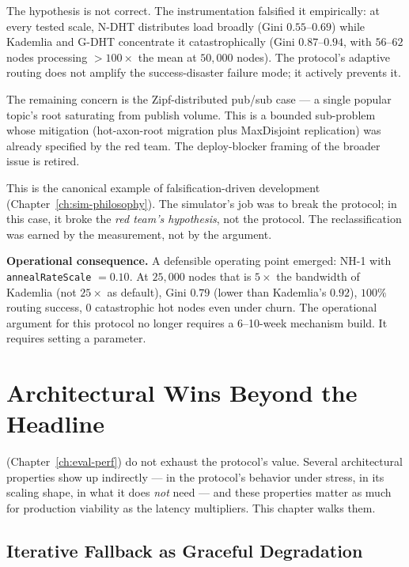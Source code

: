 \documentclass[twoside,nobib]{tufte-book}
\newcommand{\NDHT}{N-DHT\xspace}
\newcommand{\GDHT}{G-DHT\xspace}
\begin{document}
The hypothesis is not correct. The instrumentation falsified it
empirically: at every tested scale, \NDHT distributes load
broadly (Gini $0.55$--$0.69$) while Kademlia and \GDHT
concentrate it catastrophically (Gini $0.87$--$0.94$, with
$56$--$62$ nodes processing $>100\times$ the mean at
$50{,}000$ nodes). The protocol's adaptive routing does not
amplify the success-disaster failure mode; it actively prevents
it.

The remaining concern is the Zipf-distributed pub/sub case ---
a single popular topic's root saturating from publish volume.
This is a bounded sub-problem whose mitigation (hot-axon-root
migration plus MaxDisjoint replication) was already specified
by the red team. The deploy-blocker framing of the broader issue
is retired.

This is the canonical example of falsification-driven
development (Chapter~\ref{ch:sim-philosophy}). The simulator's
job was to break the protocol; in this case, it broke the
\emph{red team's hypothesis}, not the protocol. The
reclassification was earned by the measurement, not by the
argument.

\textbf{Operational consequence.} A defensible operating point
emerged: NH-1 with \texttt{annealRateScale} $= 0.10$. At
$25{,}000$ nodes that is $5\times$ the bandwidth of Kademlia
(not $25\times$ as default), Gini $0.79$ (lower than Kademlia's
$0.92$), $100\%$ routing success, $0$ catastrophic hot nodes
even under churn. The operational argument for this protocol
no longer requires a 6--10-week mechanism build. It requires
setting a parameter.


\chapter{Architectural Wins Beyond the Headline}
\label{ch:eval-wins}

 (Chapter~\ref{ch:eval-perf})
do not exhaust the protocol's value. Several architectural
properties show up indirectly --- in the protocol's behavior
under stress, in its scaling shape, in what it does \emph{not}
need --- and these properties matter as much for production
viability as the latency multipliers. This chapter walks them.

\section{Iterative Fallback as Graceful Degradation}
\end{document}
